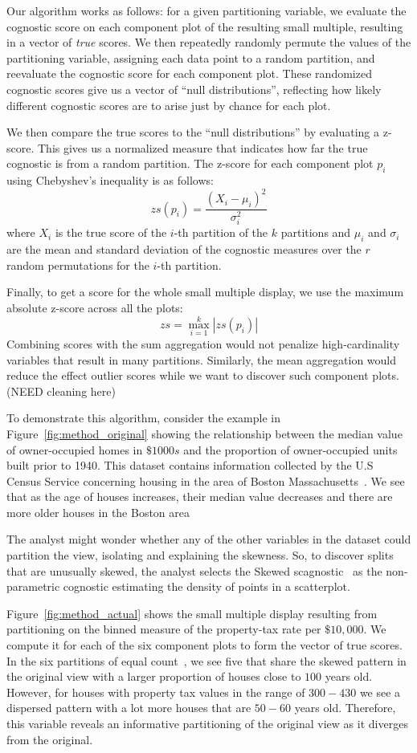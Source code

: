 Our algorithm works as follows: for a given partitioning variable, we evaluate the cognostic score on each component plot of the resulting small multiple, resulting in a vector of \emph{true} scores. We then repeatedly randomly permute the values of the partitioning variable, assigning each data point to a random partition, and reevaluate the cognostic score for each component plot. These randomized cognostic scores give us a vector of ``null distributions'', reflecting how likely different cognostic scores are to arise just by chance for each plot.

We then compare the true scores to the ``null distributions'' by evaluating a z-score. This gives us a normalized measure that indicates how far the true cognostic is from a random partition. The z-score for each component plot $p_i$ using Chebyshev's inequality is as follows:
$$zs(p_i) = \frac{(X_i-\mu_i)^2}{\sigma_i^2}$$ 
where $X_i$ is the true score of the $i$-th partition of the $k$ partitions and $\mu_i$ and $\sigma_i$ are the mean and standard deviation of the cognostic measures over the $r$ random permutations for the $i$-th partition.

Finally, to get a score for the whole small multiple display, we use the maximum absolute z-score across all the plots: 
$$zs = \max_{i=1}^k |zs(p_i)|$$ 
Combining scores with the sum aggregation would not penalize high-cardinality variables that result in many partitions. Similarly, the mean aggregation would reduce the effect outlier scores while we want to discover such component plots. (NEED cleaning here)

To demonstrate this algorithm, consider the example in Figure~\ref{fig:method_original} showing the relationship between the median value of owner-occupied homes in $\$1000s$ and the proportion of owner-occupied units built prior to 1940. This dataset contains information collected by the U.S Census Service concerning housing in the area of Boston Massachusetts~\cite{Harrison1978}. We see that as the age of houses increases, their median value decreases and there are more older houses in the Boston area

The analyst might wonder whether any of the other variables in the dataset could partition the view, isolating and explaining the skewness. So, to discover splits that are unusually skewed, the analyst selects the Skewed scagnostic~\cite{Wilkinson2005} as the non-parametric cognostic estimating the density of points in a scatterplot. 

Figure~\ref{fig:method_actual} shows the small multiple display resulting from partitioning on the binned measure of the property-tax rate per $\$10,000$. We compute it for each of the six component plots to form the vector of true scores. In the six partitions of equal count~\cite{Becker1996}, we see five that share the skewed pattern in the original view with a larger proportion of houses close to $100$ years old. However, for houses with property tax values in the range of $300-430$ we see a dispersed pattern with a lot more houses that are $50-60$ years old. Therefore, this variable reveals an informative partitioning of the original view as it diverges from the original.

